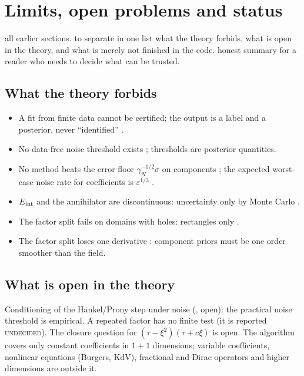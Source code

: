 \section{Limits, open problems and status}\label{sec:limits}
\sectionbrief
{all earlier sections.}
{to separate in one list what the theory forbids, what is open in the theory, and what is merely not finished in the code.}
{honest summary for a reader who needs to decide what can be trusted.}

\subsection{What the theory forbids}
\begin{itemize}[nosep]
\item A fit from finite data cannot be certified; the output is a label and a posterior, never ``identified'' .
\item No data-free noise threshold exists ; thresholds are posterior quantities.
\item No method beats the error floor $\gamma_N^{-1/2}\sigma$ on components ; the expected worst-case noise rate for coefficients is $\varepsilon^{1/3}$ .
\item $E_{\mathrm{int}}$ and the annihilator are discontinuous: uncertainty only by Monte Carlo .
\item The factor split fails on domains with holes: rectangles only .
\item The factor split loses one derivative : component priors must be one order smoother than the field.
\end{itemize}

\subsection{What is open in the theory}
Conditioning of the Hankel/Prony step under noise (, open): the practical noise threshold is empirical. A repeated factor has no finite test (it is reported \textsc{undecided}). The closure question for $(\tau-\xi^2)(\tau+c\xi)$ is open. The algorithm covers only constant coefficients in $1+1$ dimensions; variable coefficients, nonlinear equations (Burgers, KdV), fractional and Dirac operators and higher dimensions are outside it.


